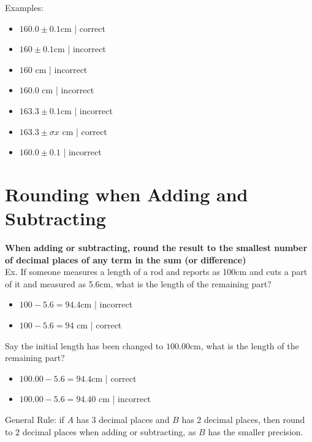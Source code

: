 \documentclass[]{article}
\date{Monday, January 23\textsuperscript{rd}, 2023}
\title{\docTitle}
\author{\docAuthor}
\date{\today}
\begin{document}
\maketitle

Examples:
\begin{itemize}
    \item $160.0 \pm 0.1$cm | correct
    \item $160 \pm 0.1$cm | incorrect
    \item $160$ cm | incorrect
    \item $160.0$ cm | incorrect
    \item $163.3 \pm 0.1$cm | incorrect
    \item $163.3 \pm \sigma x$ cm | correct
    \item $160.0 \pm 0.1$ | incorrect
\end{itemize}
\section*{Rounding when Adding and Subtracting}
\textbf{When adding or subtracting, round the result to the smallest number of decimal places of any term in the sum (or difference)}
\\
Ex. If someone measures a length of a rod and reports as 100cm and cuts a part of it and measured as 5.6cm, what is the length of the remaining part?
\begin{itemize}
    \item $100 - 5.6 = 94.4$cm | incorrect
    \item $100 - 5.6 = 94$ cm | correct
\end{itemize}

Say the initial length has been changed to $100.00$cm, what is the length of the remaining part?
\begin{itemize}
    \item $100.00 - 5.6 = 94.4$cm | correct
    \item $100.00 - 5.6 = 94.40$ cm | incorrect
\end{itemize}

General Rule: if $A$ has 3 decimal places and $B$ has 2 decimal places, then round to 2 decimal places when adding or subtracting, as $B$ has the smaller precision.
\end{document}
